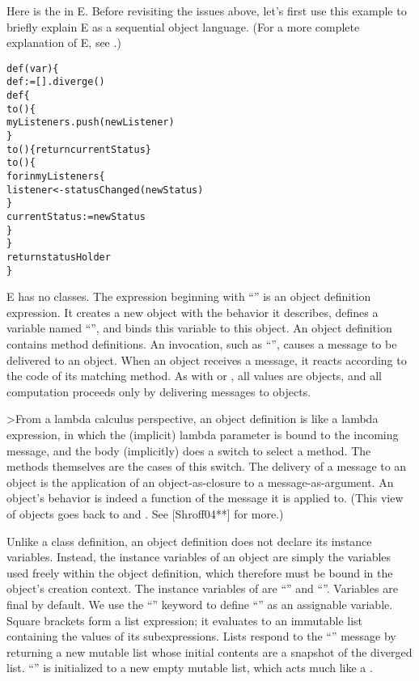 \documentclass{llncs}
\begin{document}
Here is the  in E. Before revisiting the issues
above, let's first use this example to briefly explain E as a
sequential object language. (For a more complete explanation of E, see
\cite{stiegler:ewalnut}.)
%
\begin{alltt}
    def (var ) \{
        def  := [].diverge()
        def  \{
            to () \{
                myListeners.push(newListener)
            \}
            to () \{ return currentStatus \}
            to () \{
                for  in myListeners \{
                    listener <- statusChanged(newStatus)
                \}
                currentStatus := newStatus
            \}
        \}
        return statusHolder
    \}
\end{alltt}
%
E has no classes. The expression beginning with ``'' is an object definition expression. It creates
a new object with the behavior it describes, defines a variable named
``'', and binds this variable to this object. An
object definition contains method definitions. An invocation, such as
``'', causes a message to be
delivered to an object. When an object receives a message, it reacts
according to the code of its matching method. As with 
\cite{goldberg:purplebook} or  \cite{ijcai73*235}, all
values are objects, and all computation proceeds only by delivering
messages to objects.

>From a lambda calculus perspective, an object definition is like a
lambda expression, in which the (implicit) lambda parameter is bound
to the incoming message, and the body (implicitly) does a switch to
select a method. The methods themselves are the cases of this
switch. The delivery of a message to an object is the application of
an object-as-closure to a message-as-argument. An object's behavior is
indeed a function of the message it is applied to. (This view of
objects goes back to  \cite{goldberg:smalltalk72}
and . See [Shroff04**] for more.)

Unlike a class definition, an object definition does not declare its
instance variables. Instead, the instance variables of an object are
simply the variables used freely within the object definition, which
therefore must be bound in the object's creation context. The instance
variables of  are ``'' and
``''. Variables are final by default. We use the
``'' keyword to define ``'' as an
assignable variable. Square brackets form a list expression; it
evaluates to an immutable list containing the values of its
subexpressions. Lists respond to the ``'' message by
returning a new mutable list whose initial contents are a snapshot of
the diverged list. ``'' is initialized to a new empty
mutable list, which acts much like a .
\end{document}
